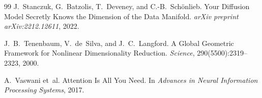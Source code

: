 \documentclass[11pt,a4paper]{article}
\theoremstyle{definition}
\theoremstyle{remark}
\begin{document}
\begin{thebibliography}{99}
J.~Stanczuk, G.~Batzolis, T.~Deveney, and C.-B.~Sch\"onlieb.
\newblock Your Diffusion Model Secretly Knows the Dimension of the Data Manifold.
\newblock \emph{arXiv preprint arXiv:2212.12611}, 2022.

J.~B.~Tenenbaum, V.~de~Silva, and J.~C.~Langford.
\newblock A Global Geometric Framework for Nonlinear Dimensionality Reduction.
\newblock \emph{Science}, 290(5500):2319--2323, 2000.

A.~Vaswani et~al.
\newblock Attention Is All You Need.
\newblock In \emph{Advances in Neural Information Processing Systems}, 2017.

\end{thebibliography}
\end{document}
